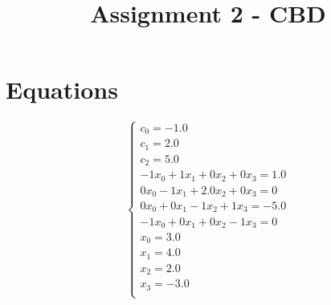 \documentclass[a4paper,12pt]{article}
\begin{document}
\title{Assignment 2 - CBD}\date{}\maketitle
\section{Equations}
\[
\left\{
\begin{array}{c}
c_0 = -1.0 \\
c_1 = 2.0 \\
c_2 = 5.0 \\
-1x_0+1x_1+0x_2+0x_3 = 1.0 \\
0x_0-1x_1+2.0x_2+0x_3 = 0 \\
0x_0+0x_1-1x_2+1x_3 = -5.0 \\
-1x_0+0x_1+0x_2-1x_3 = 0 \\
x_0 = 3.0 \\
x_1 = 4.0 \\
x_2 = 2.0 \\
x_3 = -3.0 \\
\end{array}
\right.
\]
\end{document}
